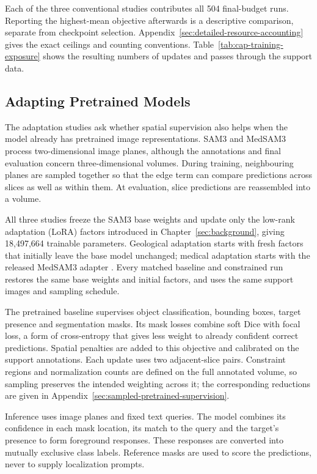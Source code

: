 \documentclass[12pt,a4paper]{article}
\begin{document}
Each of the three conventional studies contributes all 504
final-budget runs. Reporting the highest-mean objective afterwards
is a descriptive comparison, separate from checkpoint selection.
Appendix~\ref{sec:detailed-resource-accounting} gives the exact ceilings
and counting conventions. Table~\ref{tab:cap-training-exposure} shows
the resulting numbers of updates and passes through the support data.

\subsection{Adapting Pretrained Models}

The adaptation studies ask whether spatial supervision also helps
when the model already has pretrained image representations. SAM3 and
MedSAM3 process two-dimensional image planes, although the annotations
and final evaluation concern three-dimensional volumes. During
training, neighbouring planes are sampled together so that the edge
term can compare predictions across slices as well as within them.
At evaluation, slice predictions are reassembled into a volume.

All three studies freeze the SAM3 base weights and update only the
low-rank adaptation (LoRA) factors introduced in Chapter~\ref{sec:background},
giving 18,497,664 trainable parameters. Geological adaptation starts
with fresh factors that initially leave the base model unchanged;
medical adaptation starts with the released MedSAM3 adapter
\cite{carion2025sam3,liu2025medsam3}. Every matched baseline and
constrained run restores the same base weights and initial factors,
and uses the same support images and sampling schedule.

The pretrained baseline supervises object classification, bounding
boxes, target presence and segmentation masks. Its mask losses combine
soft Dice with focal loss, a form of cross-entropy that gives less
weight to already confident correct predictions. Spatial penalties
are added to this objective and calibrated on the support annotations.
Each update uses two adjacent-slice pairs. Constraint regions and
normalization counts are defined on the full annotated volume, so
sampling preserves the intended weighting across it; the corresponding
reductions are given in Appendix~\ref{sec:sampled-pretrained-supervision}.

Inference uses image planes and fixed text queries. The model combines
its confidence in each mask location, its match to the query and the
target's presence to form foreground responses. These responses are
converted into mutually exclusive class labels. Reference masks are
used to score the predictions, never to supply localization prompts.
\end{document}
